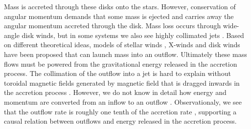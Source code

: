 \documentclass[twocolumn,trackchanges]{aastex63}
\begin{document}
Mass is accreted through these disks onto the stars. However,
conservation of angular momentum demands that some mass is ejected and
carries away the angular momentum accreted through
the disk. Mass
loss occurs through wide-angle disk winds, but in some systems we 
also see highly collimated jets \citep[see][for a
    review]{2014prpl.conf..451F}.
Based on different theoretical ideas, models of stellar winds
\citep{1988ApJ...332L..41K,2005ApJ...632L.135M}, X-winds
\citep{1994ApJ...429..781S} and disk winds
\citep{1982MNRAS.199..883B,2005ApJ...630..945A,2014MNRAS.439.3641S} have been proposed that can
launch mass into an outflow. Ultimately these mass flows  must be powered from
the gravitational energy released in the accretion process. The collimation of the outflow into a jet is hard to
explain without toroidal magnetic fields generated by
magnetic field that is dragged inwards in the accretion process \citep[see
  review by][]{2014ComAC...1....3L}.
 However, we do
not know in detail how energy and momentum are converted from an inflow to an outflow \citep[e.g.][and references therein]{2010ApJ...714..989M}.
Observationaly, we see that the outflow rate is roughly one tenth of the
accretion rate \citep{1990ApJ...354..687C,2008ApJ...689.1112C}, supporting a
causal relation between outflows and energy released in the accretion process. 
\end{document}
